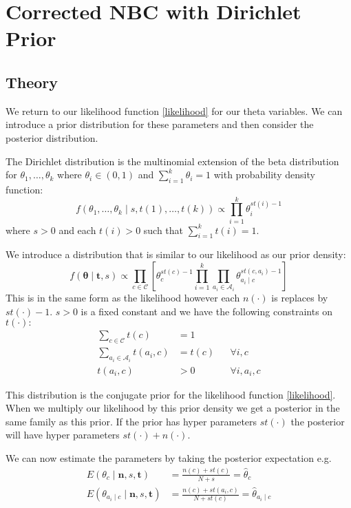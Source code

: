 \chapter{Corrected NBC with Dirichlet Prior}

\section{Theory}

We return to our likelihood function \cref{likelihood} for our theta variables.
We can introduce a prior distribution for these parameters and then consider the posterior distribution.

The Dirichlet distribution is the multinomial extension of the beta distribution for $\theta_1,\dots,\theta_k$ where $\theta_i \in (0,1)$ and $\sum_{i=1}^k \theta_i = 1$ with probability density function:
\begin{equation} \label{dirichlet_pdf}
	f(\theta_1,\dots,\theta_k \mid s, t(1),\dots,t(k)) \propto \prod_{i=1}^k \theta_i^{st(i) - 1}
\end{equation}
where $s > 0$ and each $t(i)>0$ such that $\sum_{i=1}^{k}t(i) = 1$.

We introduce a distribution that is similar to our likelihood as our prior density:
\begin{equation} \label{prior}
	f(\mathbf{\theta} \mid \mathbf{t}, s) \propto \prod_{c \in \mathcal{C}} \left[ \theta_c^{st(c) - 1} \prod_{i=1}^k \prod_{a_i \in \mathcal{A}_i} \theta_{a_i \mid c}^{st(c, a_i) - 1} \right]
\end{equation}
This is in the same form as the likelihood however each $n(\cdot)$ is replaces by $st(\cdot) - 1$.
$s > 0$ is a fixed constant and we have the following constraints on $t(\cdot):$
\begin{align}\label{prior_constraints}
	\sum_{c \in \mathcal{C}} t(c) & = 1 \\
	\sum_{a_i \in \mathcal{A}_i} t(a_i, c) & = t(c) && \forall i, c \\
	t(a_i, c) & > 0 && \forall i, a_i, c
\end{align}

This distribution is the conjugate prior for the likelihood function \cref{likelihood}.
When we multiply our likelihood by this prior density we get a posterior in the same family as this prior.
If the prior has hyper parameters $st(\cdot)$ the posterior will have hyper parameters $st(\cdot) + n(\cdot)$.

We can now estimate the parameters by taking the posterior expectation e.g.
\begin{align}
	E(\theta_c \mid \mathbf{n},s,\mathbf{t}) & = \frac{n(c) + st(c)}{N + s} = \hat{\theta}_c \\
	E(\theta_{a_i \mid c} \mid \mathbf{n},s,\mathbf{t}) & = \frac{n(c) + st(a_i, c)}{N + st(c)} = \hat{\theta}_{a_i \mid c}
\end{align}

